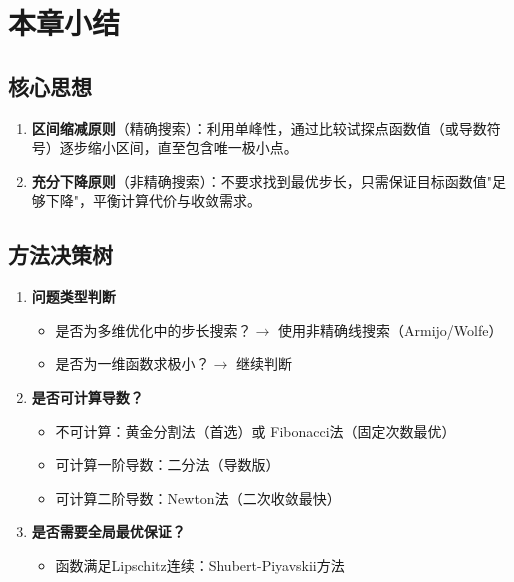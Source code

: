 \section{本章小结}\label{sec:ch4-summary}

\subsection{核心思想}

\begin{conceptbox}[一维搜索的两大统一原则]
\begin{enumerate}[label=\arabic*., leftmargin=2em]
    \item \textbf{区间缩减原则}（精确搜索）：利用单峰性，通过比较试探点函数值（或导数符号）逐步缩小区间，直至包含唯一极小点。
    \item \textbf{充分下降原则}（非精确搜索）：不要求找到最优步长，只需保证目标函数值"足够下降"，平衡计算代价与收敛需求。
\end{enumerate}
\end{conceptbox}

\subsection{方法决策树}

\begin{conceptbox}[如何选择一维搜索方法]
\begin{enumerate}[label=\arabic*., leftmargin=2em]
    \item \textbf{问题类型判断}
    \begin{itemize}
        \item 是否为多维优化中的步长搜索？$\rightarrow$ 使用非精确线搜索（Armijo/Wolfe）
        \item 是否为一维函数求极小？$\rightarrow$ 继续判断
    \end{itemize}
    \item \textbf{是否可计算导数？}
    \begin{itemize}
        \item 不可计算：黄金分割法（首选）或 Fibonacci法（固定次数最优）
        \item 可计算一阶导数：二分法（导数版）
        \item 可计算二阶导数：Newton法（二次收敛最快）
    \end{itemize}
    \item \textbf{是否需要全局最优保证？}
    \begin{itemize}
        \item 函数满足Lipschitz连续：Shubert-Piyavskii方法
    \end{itemize}
\end{enumerate}
\end{conceptbox}

